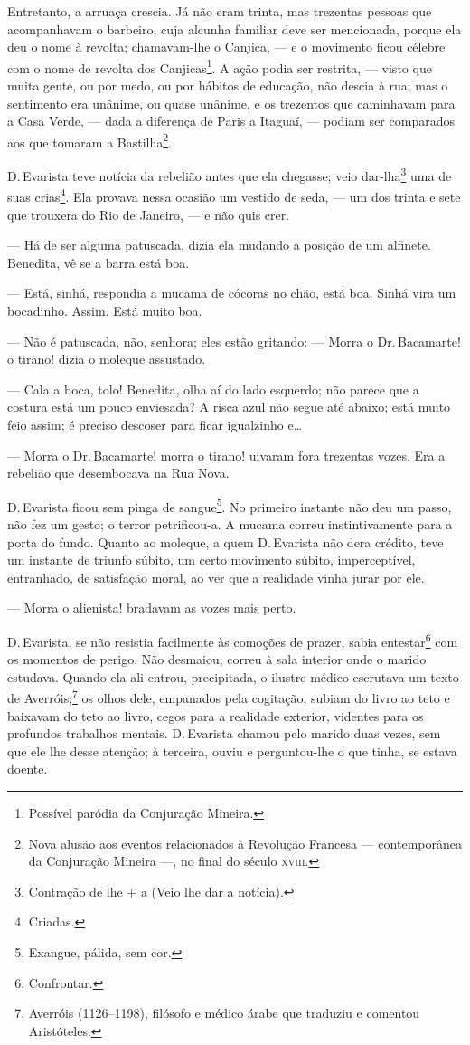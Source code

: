 Entretanto, a arruaça crescia. Já não eram trinta, mas trezentas pessoas
que acompanhavam o barbeiro, cuja alcunha familiar deve ser mencionada,
porque ela deu o nome à revolta; chamavam-lhe o Canjica, --- e o
movimento ficou célebre com o nome de revolta dos Canjicas\footnote{Possível
  paródia da Conjuração Mineira.}. A ação podia ser restrita, --- visto
que muita gente, ou por medo, ou por hábitos de educação, não descia à
rua; mas o sentimento era unânime, ou quase unânime, e os trezentos que
caminhavam para a Casa Verde, --- dada a diferença de Paris a Itaguaí,
--- podiam ser comparados aos que tomaram a Bastilha\footnote{Nova
  alusão aos eventos relacionados à Revolução Francesa --- contemporânea
  da Conjuração Mineira ---, no final do século \textsc{xviii}.}.

D.\,Evarista teve notícia da rebelião antes que ela chegasse; veio
dar-lha\footnote{Contração de lhe + a (Veio lhe dar a notícia).} uma de
suas crias\footnote{Criadas.}. Ela provava nessa ocasião um vestido de
seda, --- um dos trinta e sete que trouxera do Rio de Janeiro, --- e não
quis crer.

--- Há de ser alguma patuscada, dizia ela mudando a posição de um
alfinete. Benedita, vê se a barra está boa.

--- Está, sinhá, respondia a mucama de cócoras no chão, está boa. Sinhá
vira um bocadinho. Assim. Está muito boa.

--- Não é patuscada, não, senhora; eles estão gritando: --- Morra o
Dr.\,Bacamarte! o tirano! dizia o moleque assustado.

--- Cala a boca, tolo! Benedita, olha aí do lado esquerdo; não parece
que a costura está um pouco enviesada? A risca azul não segue até
abaixo; está muito feio assim; é preciso descoser para ficar igualzinho
e\ldots{}

--- Morra o Dr.\,Bacamarte! morra o tirano! uivaram fora trezentas vozes.
Era a rebelião que desembocava na Rua Nova.

D.\,Evarista ficou sem pinga de sangue\footnote{Exangue, pálida, sem cor.}.
No primeiro instante não deu um passo, não fez um gesto; o terror
petrificou-a. A mucama correu instintivamente para a porta do fundo.
Quanto ao moleque, a quem D.\,Evarista não dera crédito, teve um instante
de triunfo súbito, um certo movimento súbito, imperceptível, entranhado,
de satisfação moral, ao ver que a realidade vinha jurar por ele.

--- Morra o alienista! bradavam as vozes mais perto.

D.\,Evarista, se não resistia facilmente às comoções de prazer, sabia
entestar\footnote{Confrontar.} com os momentos de perigo. Não desmaiou;
correu à sala interior onde o marido estudava. Quando ela ali entrou,
precipitada, o ilustre médico escrutava um texto de Averróis;\footnote{Averróis
  (1126--1198), filósofo e médico árabe que traduziu e comentou
  Aristóteles.} os olhos dele, empanados pela cogitação, subiam do livro
ao teto e baixavam do teto ao livro, cegos para a realidade exterior,
videntes para os profundos trabalhos mentais. D.\,Evarista chamou pelo
marido duas vezes, sem que ele lhe desse atenção; à terceira, ouviu e
perguntou-lhe o que tinha, se estava doente.

